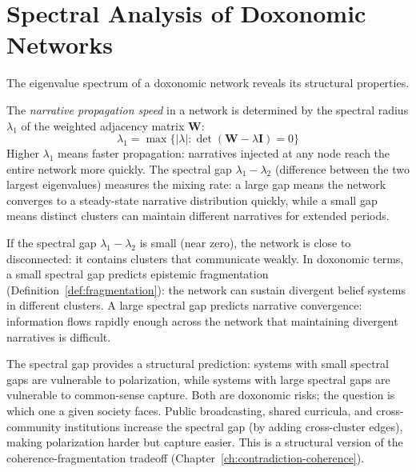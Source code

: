 \section{Spectral Analysis of Doxonomic Networks}
\label{sec:ch15-spectral}

The eigenvalue spectrum of a doxonomic network reveals its structural properties.

\begin{definition}
\label{def:propagation-speed}
The \emph{narrative propagation speed} in a network is determined by the spectral radius $\lambda_1$ of the weighted adjacency matrix $\bm{W}$:
\[
  \lambda_1 = \max\{|\lambda| : \det(\bm{W} - \lambda \bm{I}) = 0\}
\]
Higher $\lambda_1$ means faster propagation: narratives injected at any node reach the entire network more quickly.
The spectral gap $\lambda_1 - \lambda_2$ (difference between the two largest eigenvalues) measures the mixing rate: a large gap means the network converges to a steady-state narrative distribution quickly, while a small gap means distinct clusters can maintain different narratives for extended periods.
\end{definition}

\begin{proposition}
\label{prop:spectral-fragmentation}
If the spectral gap $\lambda_1 - \lambda_2$ is small (near zero), the network is close to disconnected: it contains clusters that communicate weakly.
In doxonomic terms, a small spectral gap predicts epistemic fragmentation (Definition~\ref{def:fragmentation}): the network can sustain divergent belief systems in different clusters.
A large spectral gap predicts narrative convergence: information flows rapidly enough across the network that maintaining divergent narratives is difficult.
\end{proposition}

\begin{remark}
The spectral gap provides a structural prediction: systems with small spectral gaps are vulnerable to polarization, while systems with large spectral gaps are vulnerable to common-sense capture.
Both are doxonomic risks; the question is which one a given society faces.
Public broadcasting, shared curricula, and cross-community institutions increase the spectral gap (by adding cross-cluster edges), making polarization harder but capture easier.
This is a structural version of the coherence-fragmentation tradeoff (Chapter~\ref{ch:contradiction-coherence}).
\end{remark}


